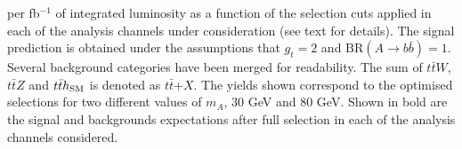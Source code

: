 \documentclass[preprintnumbers,superscriptaddress,nofootinbib,aps,prd,floatfix]{revtex4}
\newcommand{\ttbar}{\ensuremath{t\bar{t}}}
\newcommand{\BR} {\ensuremath{\mathrm{BR}}}
\begin{document}
\begin{table}[h]
\begin{center}
{{per fb$^{-1}$ of integrated luminosity as a function of the selection cuts applied in each
of the analysis channels under consideration (see text for details).
The signal prediction is obtained under the assumptions that $g_t=2$ and $\BR(A\to b\bar{b})=1$.
Several background categories have been merged for readability. The sum of 
$\ttbar W$, $\ttbar Z$ and $\ttbar h_{\rm SM}$ is denoted as $\ttbar$+$X$. 
The yields shown correspond to the optimised selections for two different values
of $m_A$, 30 GeV and 80 GeV. Shown in bold are the signal and backgrounds
expectations after full selection in each of the analysis channels considered.}}
\label{tab:yields} 
\end{center} 
\end{table} 

\end{document}
